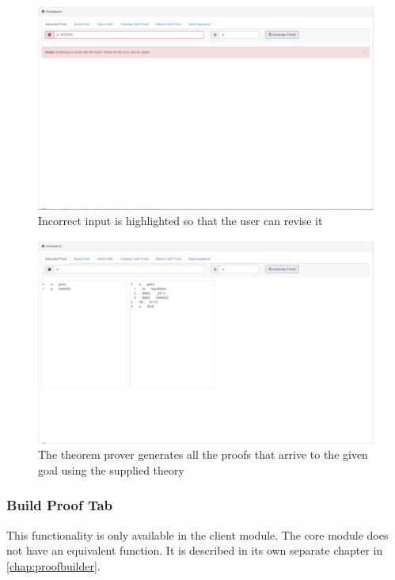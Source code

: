 \documentclass[11pt,twoside,a4paper]{report}
\begin{document}
\begin{figure}[htp]
\centerline{\includegraphics[scale=0.3]{img/scr-client-genprooffail.png}}
\caption{Incorrect input is highlighted so that the user can revise it\label{fig:scrclientgenprooffail}}
\end{figure}

\begin{figure}[htp]
\centerline{\includegraphics[scale=0.3]{img/scr-client-genproof.png}}
\caption{The theorem prover generates all the proofs that arrive to the given goal using the supplied theory\label{fig:scrclientgenproof}}
\end{figure}

\subsubsection{Build Proof Tab}
This functionality is only available in the client module. The core module does not have an equivalent function. It is described in its own separate chapter in \autoref{chap:proofbuilder}.
\end{document}
